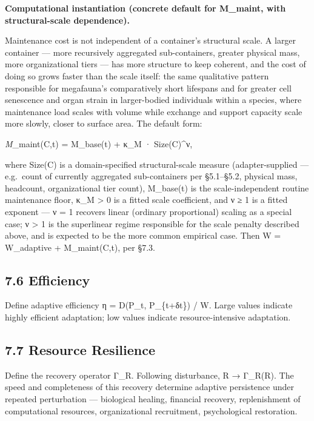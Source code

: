 \documentclass[
]{article}
\begin{document}
\textbf{Computational instantiation (concrete default for M\_maint, with
structural-scale dependence).}

Maintenance cost is not independent of a container's structural scale. A
larger container --- more recursively aggregated sub-containers, greater
physical mass, more organizational tiers --- has more structure to keep
coherent, and the cost of doing so grows faster than the scale itself:
the same qualitative pattern responsible for megafauna's comparatively
short lifespans and for greater cell senescence and organ strain in
larger-bodied individuals within a species, where maintenance load
scales with volume while exchange and support capacity scale more
slowly, closer to surface area. The default form:

\emph{M}\_maint(C,t) = M\_base(t) + κ\_M · Size(C)\^{}ν,

where Size(C) is a domain-specified structural-scale measure
(adapter-supplied --- e.g.~count of currently aggregated sub-containers
per §5.1--§5.2, physical mass, headcount, organizational tier count),
M\_base(t) is the scale-independent routine maintenance floor, κ\_M
\textgreater{} 0 is a fitted scale coefficient, and ν ≥ 1 is a fitted
exponent --- ν = 1 recovers linear (ordinary proportional) scaling as a
special case; ν \textgreater{} 1 is the superlinear regime responsible
for the scale penalty described above, and is expected to be the more
common empirical case. Then W = W\_adaptive + M\_maint(C,t), per §7.3.

\hypertarget{efficiency}{%
\subsection{7.6 Efficiency}\label{efficiency}}

Define adaptive efficiency η = D(P\_t, P\_\{t+δt\}) / W. Large values
indicate highly efficient adaptation; low values indicate
resource-intensive adaptation.

\hypertarget{resource-resilience}{%
\subsection{7.7 Resource Resilience}\label{resource-resilience}}

Define the recovery operator Γ\_R. Following disturbance, R → Γ\_R(R).
The speed and completeness of this recovery determine adaptive
persistence under repeated perturbation --- biological healing,
financial recovery, replenishment of computational resources,
organizational recruitment, psychological restoration.
\end{document}

